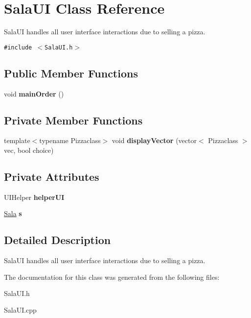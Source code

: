 \hypertarget{class_sala_u_i}{
\section{Sala\-UI Class Reference}
\label{class_sala_u_i}
}
Sala\-UI handles all user interface interactions due to selling a pizza.  


{\tt \#include $<$Sala\-UI.h$>$}

\subsection*{Public Member Functions}
\begin{CompactItemize}
\item 
\hypertarget{class_sala_u_i_d30e21f7319d652c2a2fd88dc274cfbc}{
void {\bf main\-Order} ()}
\label{class_sala_u_i_d30e21f7319d652c2a2fd88dc274cfbc}

\end{CompactItemize}
\subsection*{Private Member Functions}
\begin{CompactItemize}
\item 
\hypertarget{class_sala_u_i_4ea2f17c1ceb659e1244e7d7330cdee5}{
template$<$typename Pizzaclass$>$ void {\bf display\-Vector} (vector$<$ Pizzaclass $>$ vec, bool choice)}
\label{class_sala_u_i_4ea2f17c1ceb659e1244e7d7330cdee5}

\end{CompactItemize}
\subsection*{Private Attributes}
\begin{CompactItemize}
\item 
\hypertarget{class_sala_u_i_165ca02db075e280199e0970e3465900}{
UIHelper {\bf helper\-UI}}
\label{class_sala_u_i_165ca02db075e280199e0970e3465900}

\item 
\hypertarget{class_sala_u_i_03c7c0ace395d80182db07ae2c30f034}{
\hyperlink{class_sala}{Sala} {\bf s}}
\label{class_sala_u_i_03c7c0ace395d80182db07ae2c30f034}

\end{CompactItemize}


\subsection{Detailed Description}
Sala\-UI handles all user interface interactions due to selling a pizza. 



The documentation for this class was generated from the following files:\begin{CompactItemize}
\item 
Sala\-UI.h\item 
Sala\-UI.cpp\end{CompactItemize}
